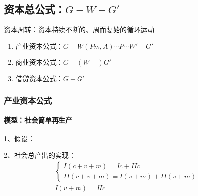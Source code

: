 \documentclass[12pt]{book}
\begin{document}





\subsection{资本总公式：$G-W-G'$}

\par 资本周转：资本持续不断的、周而复始的循环运动
\begin{enumerate}[(1)]
    \item 产业资本公式：$G-W(Pm,A)\cdots P\cdots W′-G′$
    \item 商业资本公式：$G-(W-)G'$
    \item 借贷资本公式：$G-G'$
\end{enumerate}


\subsubsection{产业资本公式}



\paragraph{模型：社会简单再生产}


1、假设：


2、社会总产出的实现：
\begin{gather*}
    \begin{cases}
        I(c+v+m)=I c+II c \\
        II (c+v+m)=I(v+m)+II(v+m)
    \end{cases}\\
    I(v+m)=IIc
\end{gather*}
\end{document}
